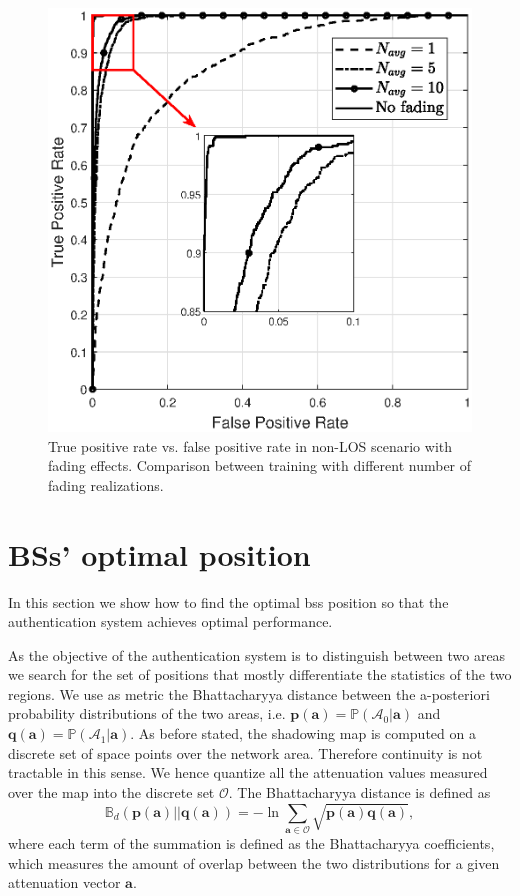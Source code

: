 \documentclass[draftcls,onecolumn,12pt]{IEEEtran}
\begin{document}
\begin{figure}
    \centering
    \includegraphics[width=0.5\columnwidth]{Navg.eps}
    \caption{True positive rate vs. false positive rate in non-LOS scenario with fading effects. Comparison between training with different number of fading realizations.}
    \label{fig:faded}
\end{figure}
\newpage 

\section{BSs' optimal position}\label{sec:bsPos}
In this section we show how to find the optimal \acp{bs} position so that the authentication system achieves optimal performance.

As the objective of the authentication system is to distinguish between two areas we search for the set of positions that mostly differentiate the statistics of the two regions. We use as metric the Bhattacharyya distance between the a-posteriori probability distributions of the two areas, i.e. $\bm{p}(\bm{a})=\mathbb{P}(\mathcal{A}_0|\bm{a})$ and $\bm{q}(\bm{a})=\mathbb{P}(\mathcal{A}_1|\bm{a})$. As before stated, the shadowing map is computed on a discrete set of space points over the network area. Therefore continuity is not tractable in this sense. We hence quantize all the attenuation values measured over the map into the discrete set $\mathcal{O}$.
The Bhattacharyya distance is defined as
\begin{equation}\label{eq:Bd}
    \mathbb{B}_d(\bm{p}(\bm{a})||\bm{q}(\bm{a})) = -\ln{\sum_{\bm{a}\in\mathcal{O}}\sqrt{\bm{p(a)q(a)}}},
\end{equation}
where each term of the summation is defined as the Bhattacharyya coefficients, which measures the amount of overlap between the two distributions for a given attenuation vector $\bm{a}$.
\end{document}

